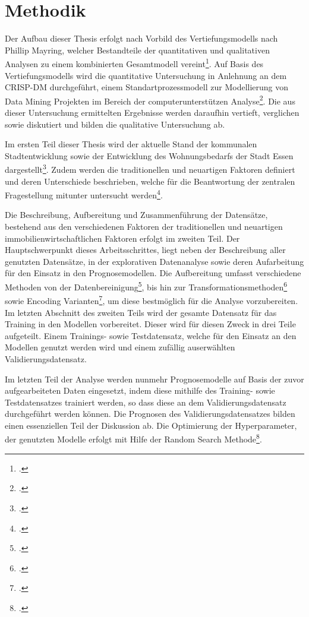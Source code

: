 \section{Methodik}
Der Aufbau dieser Thesis erfolgt nach Vorbild des Vertiefungsmodells 
nach Phillip Mayring, welcher Bestandteile der quantitativen und 
qualitativen Analysen zu einem kombinierten Gesamtmodell vereint\footcite[Vgl. ][]{Mayring2001}.  
Auf Basis des Vertiefungsmodells wird die quantitative Untersuchung 
in Anlehnung an dem CRISP-DM durchgeführt, einem Standartprozessmodell 
zur Modellierung von Data Mining Projekten im Bereich der 
computerunterstützen Analyse\footcite[Vgl. ][]{Wirth2000}. Die aus dieser Untersuchung 
ermittelten Ergebnisse werden daraufhin vertieft, verglichen sowie diskutiert und 
bilden die qualitative Untersuchung ab.

Im ersten Teil dieser Thesis wird der aktuelle Stand der kommunalen Stadtentwicklung 
sowie der Entwicklung des Wohnungsbedarfs der Stadt Essen dargestellt\footcite[Vgl. ][]{StadtEssen2018}. 
Zudem werden die traditionellen und neuartigen Faktoren definiert und deren Unterschiede 
beschrieben, welche für die Beantwortung der zentralen Fragestellung mitunter 
untersucht werden\footcite[Vgl. ][]{Asaftei2018}.

Die Beschreibung, Aufbereitung und Zusammenführung der Datensätze, bestehend aus den 
verschiedenen Faktoren der traditionellen und neuartigen immobilienwirtschaftlichen 
Faktoren erfolgt im zweiten Teil. Der Hauptschwerpunkt dieses Arbeitsschrittes, liegt 
neben der Beschreibung aller genutzten Datensätze, in der explorativen Datenanalyse sowie 
deren Aufarbeitung für den Einsatz in den Prognosemodellen. Die Aufbereitung umfasst 
verschiedene Methoden von der Datenbereinigung\footcite[Vgl. ][]{Rahm2000}, bis hin zur 
Transformationsmethoden\footcite[Vgl. ][]{Box1964} sowie Encoding Varianten\footcite[Vgl. ][]{Cerda2018}, 
um diese bestmöglich für die Analyse vorzubereiten. Im letzten Abschnitt des zweiten 
Teils wird der gesamte Datensatz für das Training in den Modellen 
vorbereitet. Dieser wird für diesen Zweck in drei Teile aufgeteilt. Einem Trainings- 
sowie Testdatensatz, welche für den Einsatz an den Modellen genutzt werden wird und 
einem zufällig auserwählten Validierungsdatensatz.

Im letzten Teil der Analyse werden nunmehr Prognosemodelle auf Basis der zuvor 
aufgearbeiteten Daten eingesetzt, indem diese mithilfe des Training- sowie Testdatensatzes 
trainiert werden, so dass diese an dem Validierungsdatensatz durchgeführt werden können. 
Die Prognosen des Validierungsdatensatzes bilden einen essenziellen Teil der Diskussion ab. 
Die Optimierung der Hyperparameter, der genutzten Modelle erfolgt mit Hilfe der Random 
Search Methode\footcite[Vgl. ][]{Bergstra2012}.

